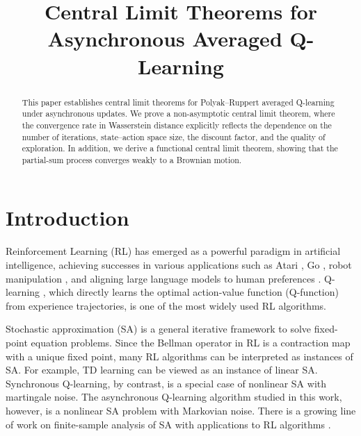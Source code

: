 \documentclass{opt2025} %
\title[Central Limit Theorems for Asynchronous Averaged Q-Learning]{Central Limit Theorems for Asynchronous Averaged Q-Learning}
\begin{document}
\maketitle

\begin{abstract}
This paper establishes central limit theorems for Polyak–Ruppert averaged Q-learning under asynchronous updates. We prove a non-asymptotic central limit theorem, where the convergence rate in Wasserstein distance explicitly reflects the dependence on the number of iterations, state–action space size, the discount factor, and the quality of exploration. In addition, we derive a functional central limit theorem, showing that the partial-sum process converges weakly to a Brownian motion.
\end{abstract}




\section{Introduction}

Reinforcement Learning (RL) has emerged as a powerful paradigm in artificial intelligence, achieving successes in various applications such as Atari \citep{mnih2015human}, Go \citep{silver2016mastering}, robot manipulation \citep{tan2018sim,zeng2020tossingbot}, and aligning large language models to human preferences \citep{shao2024deepseekmath,ouyang2022training}. Q-learning \citep{watkins1992q}, which directly learns the optimal action-value function (Q-function) from experience trajectories, is one of the most widely used RL algorithms.

Stochastic approximation (SA) \citep{benveniste2012adaptive, borkar2008stochastic} is a general iterative framework to solve fixed-point equation problems. Since the Bellman operator in RL is a contraction map with a unique fixed point, many RL algorithms can be interpreted as instances of SA. For example, TD learning \citep{sutton1998reinforcement} can be viewed as an instance of linear SA. Synchronous Q-learning, by contrast, is a special case of nonlinear SA with martingale noise. The asynchronous Q-learning algorithm studied in this work, however, is a nonlinear SA problem with Markovian noise. There is a growing line of work on finite-sample analysis of SA with applications to RL algorithms \citep{Wai19CC, srikant2019finite, bhandari2018finite, chen2022finite, chen2020finite, qu2020finite, khodadadian2025general, chandak2025finite, chandak20251}.
\end{document}
